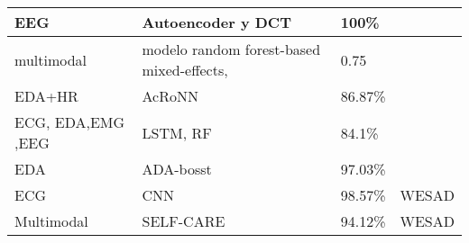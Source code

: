 \begin{table}[h!]
\begin{scriptsize}
\begin{tabular}{|l|l|l|l|}
    EEG            &Autoencoder  y DCT                                 & 100\%           &   \cite{computation7010013}               \\ \hline
    
    multimodal            &modelo random forest-based mixed-effects,                                 & 0.75            &   \cite{10.1145/3460421.3480429}               \\ \hline
    
    
    EDA+HR          &AcRoNN                           & 86.87\%            &   \cite{alam2021activity}               \\ \hline
    
    ECG, EDA,EMG  ,EEG          &LSTM, RF                           & 84.1\%            &   \cite{Jaiswal2022AssessingFW}               \\ \hline
    
    EDA            & ADA-bosst                        & 97.03\%            &   \cite{9995093}               \\ \hline
    
    ECG           & CNN                   &  98.57\%            &   WESAD\cite{YING2023763}               \\ \hline
    
    Multimodal           & SELF-CARE                  &  94.12\%            &   WESAD\cite{rashid2023stress}               \\ \hline
    
    
    \end{tabular}
    \end{scriptsize} %
    \end{table}
    
    
    